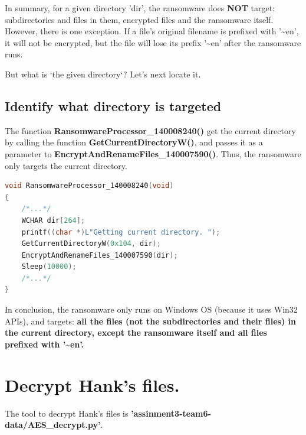 \documentclass[11pt]{article}
\begin{document}
In summary, for a given directory 'dir', the ransomware does \textbf{NOT} target: subdirectories and files in them, encrypted files and the ransomware itself. However, there is one exception. If a file's original filename is prefixed with '\textasciitilde en', it will not be encrypted, but the file will lose its prefix '\textasciitilde en' after the ransomware runs.

But what is `the given directory`? Let's next locate it.

\subsection{Identify what directory is targeted}
The function \textbf{RansomwareProcessor\_140008240()} get the current directory by calling the function \textbf{GetCurrentDirectoryW()}, and passes it as a parameter to \textbf{EncryptAndRenameFiles\_140007590()}. Thus, the ransomware only targets the current directory.
\begin{lstlisting}[language=c++, caption=Part of RansomwareProcessor\_140008240]
void RansomwareProcessor_140008240(void)
{
    /*...*/
    WCHAR dir[264];
    printf((char *)L"Getting current directory. ");
    GetCurrentDirectoryW(0x104, dir);
    EncryptAndRenameFiles_140007590(dir);
    Sleep(10000);
    /*...*/
}
\end{lstlisting}

In conclusion, the ransomware only runs on Windows OS (because it uses Win32 APIs), and targets: \textbf{all the files (not the subdirectories and their files) in the current directory, except the ransomware itself and all files prefixed with '\textasciitilde en'.}

\section{Decrypt Hank's files.}
The tool to decrypt Hank's files is \textbf{'assinment3-team6-data/AES\_decrypt.py'}.



\end{document}
